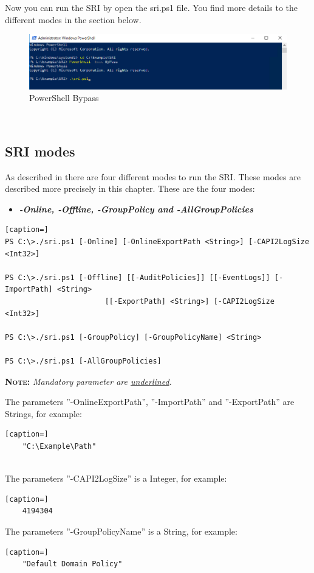 Now you can run the SRI by open the sri.ps1 file. You find more details to the different modes in the section below.
\begin{figure}[H]
    \centering
    \includegraphics[width=1\linewidth]{../user_manual/assets/sri_ps1.png}
    \caption{PowerShell Bypass}
\end{figure} \ \\

\subsection{SRI modes}
As described in  there are four different modes to run the SRI. These modes are described more precisely in this chapter. These are the four modes:
\begin{itemize}
    \item \textbf{\textit{-Online, -Offline, -GroupPolicy and -AllGroupPolicies}}
\end{itemize}
\begin{lstlisting}[caption=]
PS C:\>./sri.ps1 [-Online] [-OnlineExportPath <String>] [-CAPI2LogSize <Int32>]

PS C:\>./sri.ps1 [-Offline] [[-AuditPolicies]] [[-EventLogs]] [-ImportPath] <String> 
                       [[-ExportPath] <String>] [-CAPI2LogSize <Int32>]

PS C:\>./sri.ps1 [-GroupPolicy] [-GroupPolicyName] <String>

PS C:\>./sri.ps1 [-AllGroupPolicies]
\end{lstlisting}

\vspace{0.5cm}
\textsc{\textbf{Note:}}\textit{ Mandatory parameter are \underline{underlined}.}
\vspace{0.5cm}

\clearpage
The parameters ''-OnlineExportPath'', ''-ImportPath'' and ''-ExportPath'' are Strings, for example:\ \\
\begin{lstlisting}[caption=]
    "C:\Example\Path"
\end{lstlisting} \ \\
The parameters ''-CAPI2LogSize'' is a Integer, for example:\ \\
\begin{lstlisting}[caption=]
    4194304
\end{lstlisting}
The parameters ''-GroupPolicyName'' is a String, for example:\ \\
\begin{lstlisting}[caption=]
    "Default Domain Policy"
\end{lstlisting}

